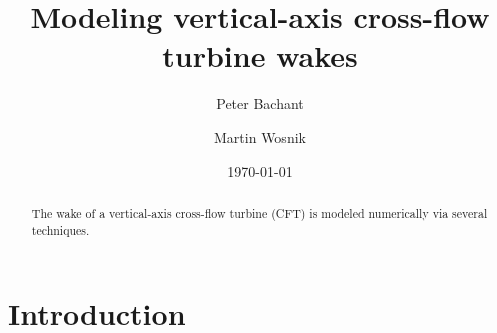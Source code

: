 \documentclass[aip,graphicx]{revtex4-1}
\begin{document}
\preprint{}

\title{Modeling vertical-axis cross-flow turbine wakes}



\author{Peter Bachant}

\author{Martin Wosnik} 


\date{\today}

\begin{abstract}
The wake of a vertical-axis cross-flow turbine (CFT) is modeled numerically via
several techniques.
\end{abstract}

\pacs{}%

\maketitle %
\listoftodos

\section{Introduction}
\end{document}
